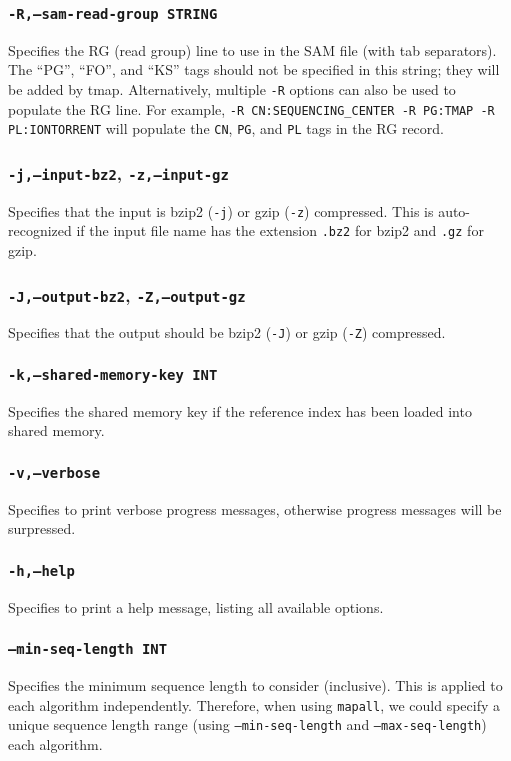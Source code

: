 \documentclass[a4paper,12pt]{book}
\newcommand{\TT}[1]{{\tt #1}} %
\begin{document}
\subsubsection{\TT{-R,--sam-read-group STRING}}
Specifies the RG (read group) line to use in the SAM file (with tab separators).
The ``PG'', ``FO'', and ``KS'' tags should not be specified in this string; they will be added by tmap.
Alternatively, multiple \TT{-R} options can also be used to populate the RG line. 
For example, \TT{-R CN:SEQUENCING\_CENTER -R PG:TMAP -R PL:IONTORRENT} will populate the \TT{CN}, \TT{PG}, and \TT{PL} tags in the RG record.

\subsubsection{\TT{-j,--input-bz2}, \TT{-z,--input-gz}}
Specifies that the input is bzip2 (\TT{-j}) or gzip (\TT{-z}) compressed.
This is auto-recognized if the input file name has the extension \TT{.bz2} for bzip2 and \TT{.gz} for gzip.

\subsubsection{\TT{-J,--output-bz2}, \TT{-Z,--output-gz}}
Specifies that the output should be bzip2 (\TT{-J}) or gzip (\TT{-Z}) compressed.

\subsubsection{\TT{-k,--shared-memory-key INT}}
Specifies the shared memory key if the reference index has been loaded into shared memory.

\subsubsection{\TT{-v,--verbose}}
Specifies to print verbose progress messages, otherwise progress messages will be surpressed.

\subsubsection{\TT{-h,--help}}
Specifies to print a help message, listing all available options.

\subsubsection{\TT{--min-seq-length INT}}
Specifies the minimum sequence length to consider (inclusive).
This is applied to each algorithm independently.
Therefore, when using \TT{mapall}, we could specify a unique sequence length range (using \TT{---min-seq-length} and \TT{---max-seq-length}) each algorithm.
\end{document}
